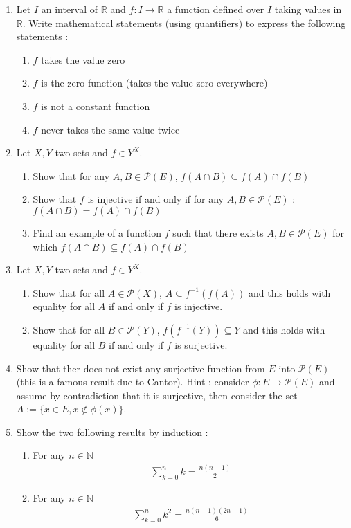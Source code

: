 \documentclass[11pt,letterpaper]{scrartcl}
\newcommand{\reals}{\mathbb{R}}
\newcommand{\naturals}{\mathbb{N}}
\newcommand{\Pcal}{\mathcal{P}}
\begin{document}
\begin{enumerate}
	\item Let $I$ an interval of $\reals$ and $f:I \rightarrow \reals$ a function defined over $I$ taking values in $\reals$. Write mathematical statements (using quantifiers) to express the following statements :
	\begin{enumerate}[label=\alph*.]
		\item $f$ takes the value zero
		\item $f$ is the zero function (takes the value zero everywhere)
		\item $f$ is not a constant function
		\item $f$ never takes the same value twice
	\end{enumerate}

	\item Let $X,Y$ two sets and $f \in Y^X$. 
	\begin{enumerate}[label=\alph*.]
		\item Show that for any $A,B \in \Pcal(E)$, $f(A \cap B) \subseteq f(A) \cap f(B)$
		\item Show that $f$ is injective if and only if for any $A,B \in \Pcal(E)$ : $f(A \cap B) = f(A) \cap f(B)$
		\item Find an example of a function $f$ such that there exists $A,B \in \Pcal(E)$ for which $f(A \cap B) \subsetneq f(A) \cap f(B)$
	\end{enumerate}

	\item Let $X,Y$ two sets and $f \in Y^X$.
	\begin{enumerate}[label=\alph*.]
		\item Show that for all $A \in \Pcal(X)$, $A \subseteq f^{-1}(f(A))$ and this holds with equality for all $A$ if and only if $f$ is injective.
		\item Show that for all $B \in \Pcal(Y)$, $f(f^{-1}(Y)) \subseteq Y$ and this holds with equality for all $B$ if and only if $f$ is surjective.
	\end{enumerate}
	
	
	\item Show that ther does not exist any surjective function from $E$ into $\Pcal(E)$ (this is a famous result due to Cantor). Hint : consider $\phi : E \rightarrow \Pcal(E)$ and assume by contradiction that it is surjective, then consider the set $A:=\{x \in E, x \notin \phi(x) \}$.

	\item Show the two following results by induction :
	\begin{enumerate}[label=\alph*.]
		\item For any $n \in \naturals$
			\begin{align*}
			\sum_{k=0}^n k = \frac{n(n+1)}{2}
			\end{align*}
		\item For any $n \in \naturals$
			\begin{align*}
			\sum_{k=0}^n k^2 = \frac{n(n+1)(2n+1)}{6}
			\end{align*}
	\end{enumerate}	
	

\end{enumerate}
\end{document}
